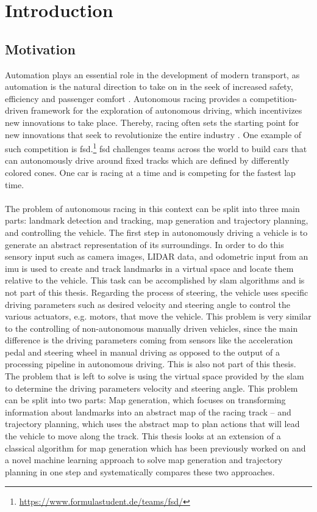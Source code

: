 \graphicspath{{Chapter/Figs/introduction/}}
\chapter{Introduction}

\section{Motivation}
Automation plays an essential role in the development of modern transport, as automation is the natural direction to take on in the seek of increased safety, efficiency and passenger comfort \cite{Lutin2018}. Autonomous racing provides a competition-driven framework for the exploration of autonomous driving, which incentivizes new innovations to take place. Thereby, racing often sets the starting point for new innovations that seek to revolutionize the entire industry \cite{Foxall91}. One example of such competition is \ac{fsd}.\footnote{\url{https://www.formulastudent.de/teams/fsd/}} \ac{fsd} challenges teams across the world to build cars that can autonomously drive around fixed tracks which are defined by differently colored cones. One car is racing at a time and is competing for the fastest lap time.\\
\\The problem of autonomous racing in this context can be split into three main parts: landmark detection and tracking, map generation and trajectory planning, and controlling the vehicle. The first step in autonomously driving a vehicle is to generate an abstract representation of its surroundings. In order to do this sensory input such as camera images, LIDAR data, and odometric input from an \ac{imu} is used to create and track landmarks in a virtual space and locate them relative to the vehicle. This task can be accomplished by \ac{slam} algorithms \cite{Singandhupe2019} and is not part of this thesis. Regarding the process of steering, the vehicle uses specific driving parameters such as desired velocity and steering angle to control the various actuators, e.g. motors, that move the vehicle. This problem is very similar to the controlling of non-autonomous manually driven vehicles, since the main difference is the driving parameters coming from sensors like the acceleration pedal and steering wheel in manual driving as opposed to the output of a processing pipeline in autonomous driving. This is also not part of this thesis. The problem that is left to solve is using the virtual space provided by the \ac{slam} to determine the driving parameters velocity and steering angle. This problem can be split into two parts: Map generation, which focuses on transforming information about landmarks into an abstract map of the racing track – and trajectory planning, which uses the abstract map to plan actions that will lead the vehicle to move along the track. This thesis looks at an extension of a classical algorithm for map generation which has been previously worked on and a novel machine learning approach to solve map generation and trajectory planning in one step and systematically compares these two approaches.\\

